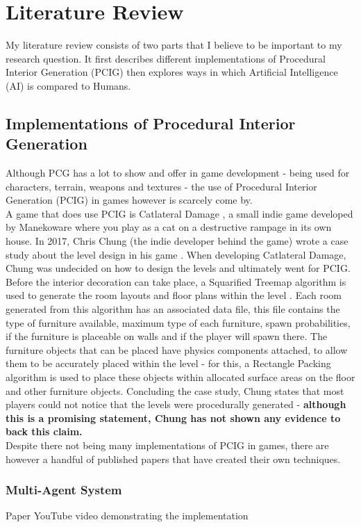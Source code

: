\section{Literature Review}
My literature review consists of two parts that I believe to be important to my research question.
It first describes different implementations of Procedural Interior Generation (PCIG) then explores
ways in which Artificial Intelligence (AI) is compared to Humans.

\subsection{Implementations of Procedural Interior Generation}
Although PCG has a lot to show and offer in game development - being used for
characters, terrain, weapons and textures - the use of Procedural Interior Generation 
(PCIG) in games however is scarcely come by.
\\
A game that does use PCIG is Catlateral Damage \cite{game:catlateral},
a small indie game developed by Manekoware where you play as a cat on a destructive rampage 
in its own house.
In 2017, Chris Chung (the indie developer behind the game) wrote a case study about the level design in his game \cite{what-is-pcg}.
When developing Catlateral Damage, Chung was 
undecided on how to design the levels and ultimately went for PCIG\cite{pcg_in_gd}.
Before the interior decoration can take place, a Squarified Treemap algorithm 
is used to generate the room layouts and floor plans within the level \cite{squarified-treemap}.
Each room generated from this algorithm has an associated data file, this file contains the type of furniture available, 
maximum type of each furniture, spawn probabilities, if the furniture is placeable on walls and if the player will spawn there.
The furniture objects that can be placed have physics components attached, to allow them to be accurately placed within the level -
for this, a Rectangle Packing algorithm is used to place these objects within allocated surface areas on the floor and other furniture objects.
Concluding the case study, Chung states that most players could not notice that the levels were procedurally generated -
\textbf{although this is a promising statement, Chung has not shown any evidence to back this claim.}
\\
Despite there not being many implementations of PCIG in games, there are however a handful of published papers that have created their own techniques.
\subsubsection*{Multi-Agent System}
Paper \cite{real-time-walkthroughs} YouTube video demonstrating the implementation \cite{youtube:real-time-walkthroughs}
